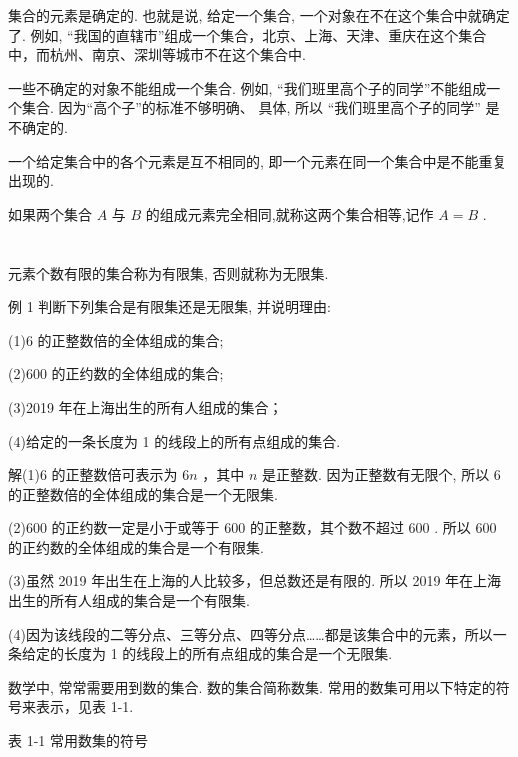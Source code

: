 \documentclass[10pt]{article}
\begin{document}
集合的元素是确定的. 也就是说, 给定一个集合, 一个对象在不在这个集合中就确定了. 例如, “我国的直辖市”组成一个集合，北京、上海、天津、重庆在这个集合中，而杭州、南京、深圳等城市不在这个集合中.

一些不确定的对象不能组成一个集合. 例如, “我们班里高个子的同学”不能组成一个集合. 因为“高个子”的标准不够明确、 具体, 所以 “我们班里高个子的同学” 是不确定的.

一个给定集合中的各个元素是互不相同的, 即一个元素在同一个集合中是不能重复出现的.

如果两个集合 \(A\) 与 \(B\) 的组成元素完全相同,就称这两个集合相等,记作 \(A = B\) .

\section*{}

\section*{}

元素个数有限的集合称为有限集, 否则就称为无限集.

例 1 判断下列集合是有限集还是无限集, 并说明理由:

(1)6 的正整数倍的全体组成的集合;

(2)600 的正约数的全体组成的集合;

(3)2019 年在上海出生的所有人组成的集合；

(4)给定的一条长度为 1 的线段上的所有点组成的集合.

解(1)6 的正整数倍可表示为 \({6n}\) ，其中 \(n\) 是正整数. 因为正整数有无限个, 所以 6 的正整数倍的全体组成的集合是一个无限集.

(2)600 的正约数一定是小于或等于 600 的正整数，其个数不超过 600 . 所以 600 的正约数的全体组成的集合是一个有限集.

(3)虽然 2019 年出生在上海的人比较多，但总数还是有限的. 所以 2019 年在上海出生的所有人组成的集合是一个有限集.

(4)因为该线段的二等分点、三等分点、四等分点……都是该集合中的元素，所以一条给定的长度为 1 的线段上的所有点组成的集合是一个无限集.

数学中, 常常需要用到数的集合. 数的集合简称数集. 常用的数集可用以下特定的符号来表示，见表 1-1.

表 1-1 常用数集的符号

\begin{center}
\end{center}
\end{document}

